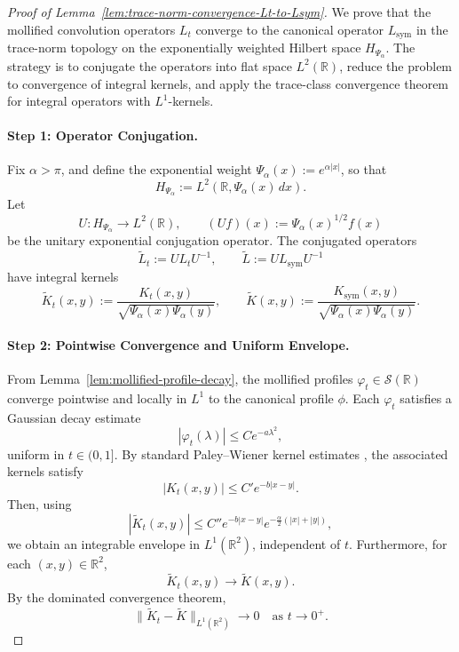 \begin{proof}[Proof of Lemma~\ref{lem:trace-norm-convergence-Lt-to-Lsym}]
We prove that the mollified convolution operators \( L_t \) converge to the canonical operator \( L_{\mathrm{sym}} \) in the trace-norm topology on the exponentially weighted Hilbert space \( H_{\Psi_\alpha} \). The strategy is to conjugate the operators into flat space \( L^2(\mathbb{R}) \), reduce the problem to convergence of integral kernels, and apply the trace-class convergence theorem for integral operators with \( L^1 \)-kernels.

\paragraph{Step 1: Operator Conjugation.}
Fix \( \alpha > \pi \), and define the exponential weight \( \Psi_\alpha(x) := e^{\alpha |x|} \), so that
\[
H_{\Psi_\alpha} := L^2(\mathbb{R}, \Psi_\alpha(x)\, dx).
\]
Let
\[
U \colon H_{\Psi_\alpha} \to L^2(\mathbb{R}), \qquad (Uf)(x) := \Psi_\alpha(x)^{1/2} f(x)
\]
be the unitary exponential conjugation operator. The conjugated operators
\[
\widetilde{L}_t := U L_t U^{-1}, \qquad \widetilde{L} := U L_{\mathrm{sym}} U^{-1}
\]
have integral kernels
\[
\widetilde{K}_t(x,y) := \frac{K_t(x,y)}{\sqrt{\Psi_\alpha(x)\Psi_\alpha(y)}}, \qquad
\widetilde{K}(x,y) := \frac{K_{\mathrm{sym}}(x,y)}{\sqrt{\Psi_\alpha(x)\Psi_\alpha(y)}}.
\]

\paragraph{Step 2: Pointwise Convergence and Uniform Envelope.}
From Lemma~\ref{lem:mollified-profile-decay}, the mollified profiles \( \varphi_t \in \mathcal{S}(\mathbb{R}) \) converge pointwise and locally in \( L^1 \) to the canonical profile \( \phi \). Each \( \varphi_t \) satisfies a Gaussian decay estimate
\[
|\varphi_t(\lambda)| \le C e^{-a\lambda^2},
\]
uniform in \( t \in (0,1] \). By standard Paley--Wiener kernel estimates \cite[Thm.~IX.12]{ReedSimon1975II}, the associated kernels satisfy
\[
|K_t(x,y)| \le C' e^{-b|x - y|}.
\]
Then, using
\[
|\widetilde{K}_t(x,y)| \le C'' e^{-b|x - y|} e^{-\frac{\alpha}{2}(|x| + |y|)},
\]
we obtain an integrable envelope in \( L^1(\mathbb{R}^2) \), independent of \( t \). Furthermore, for each \( (x,y) \in \mathbb{R}^2 \),
\[
\widetilde{K}_t(x,y) \to \widetilde{K}(x,y).
\]
By the dominated convergence theorem,
\[
\| \widetilde{K}_t - \widetilde{K} \|_{L^1(\mathbb{R}^2)} \to 0 \quad \text{as } t \to 0^+.
\]


\end{proof}
